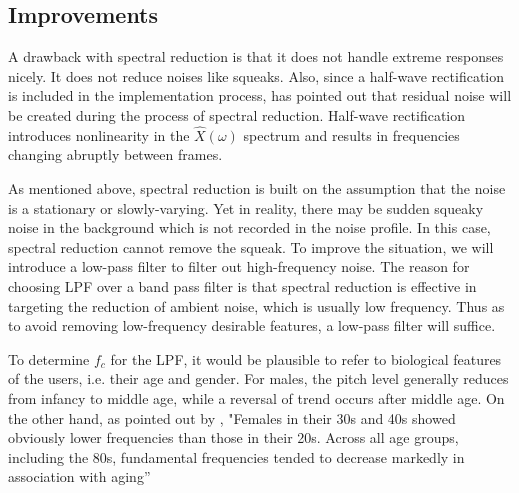 \subsection{Improvements}
A drawback with spectral reduction is that it does not handle extreme responses nicely. It does not reduce noises like
squeaks. Also, since a half-wave rectification is included in the implementation process, \cite{spectral_drawback} has 
pointed out that residual noise will be created during the process of spectral reduction. Half-wave rectification introduces
nonlinearity in the $\hat{X}(\omega)$ spectrum and results in frequencies changing abruptly between frames.

As mentioned above, spectral reduction is built on the assumption that the noise is a stationary or slowly-varying. Yet in reality,
there may be sudden squeaky noise in the background which is not recorded in the noise profile. In this case, spectral reduction 
cannot remove the squeak. To improve the situation, we will introduce a low-pass filter to filter out high-frequency noise. The reason
for choosing LPF over a band pass filter is that spectral reduction is effective in targeting the reduction of ambient noise, which is
 usually low frequency. Thus as to avoid removing low-frequency desirable features, a low-pass filter will suffice.

To determine $f_c$ for the LPF, it would be plausible to refer to biological features of the users, i.e. their age and gender.
For males, the pitch level generally reduces from infancy to middle age, while a reversal of trend occurs after middle age. 
On the other hand, as pointed out by \cite{womenprange}, "Females in their 30s and 40s showed obviously lower frequencies than those in their
20s. Across all age groups, including the 80s, fundamental frequencies tended to decrease markedly in association with aging”

